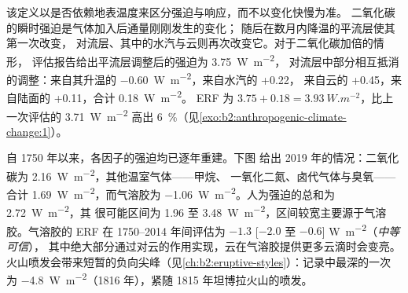 该定义以是否依赖地表温度来区分强迫与响应，而不以变化快慢为准。
二氧化碳的瞬时强迫是气体加入后通量刚刚发生的变化；
随后在数月内降温的平流层使其第一次改变，
对流层、其中的水汽与云则再次改变它。对于二氧化碳加倍的情形，
评估报告给出平流层调整后的强迫为 \qty{3.75}{W.m^{-2}}，
对流层中部分相互抵消的调整：来自其升温的 \qty{-0.60}{W.m^{-2}}，来自水汽的 +0.22，
来自云的 +0.45，来自陆面的 +0.11，合计 \qty{+0.18}{W.m^{-2}}。
ERF 为 $3.75 + 0.18 = \qty{3.93}{W.m^{-2}}$，比上一次评估的
\qty{3.71}{W.m^{-2}} 高出 \qty{6}{\percent}（见\cref{exo:b2:anthropogenic-climate-change:1}）。

自 1750 年以来，各因子的强迫均已逐年重建。下图
给出 2019 年的情况：二氧化碳为 \qty{2.16}{W.m^{-2}}，其他温室气体——甲烷、
一氧化二氮、卤代气体与臭氧——合计 \qty{1.69}{W.m^{-2}}，而气溶胶为
\qty{-1.06}{W.m^{-2}}。人为强迫的总和为 \qty{2.72}{W.m^{-2}}，其
很可能区间为 1.96 至 \qty{3.48}{W.m^{-2}}，区间较宽主要源于气溶胶。气溶胶的
ERF 在 1750--2014 年间评估为 $-1.3$ [$-2.0$ 至 $-0.6$] \unit{W.m^{-2}}（\emph{中等可信}），
其中绝大部分通过对云的作用实现，云在气溶胶提供更多云滴时会变亮。
火山喷发会带来短暂的负向尖峰（见\cref{ch:b2:eruptive-styles}）：记录中最深的一次
为 \qty{-4.8}{W.m^{-2}}（1816 年），紧随 1815 年坦博拉火山的喷发。

